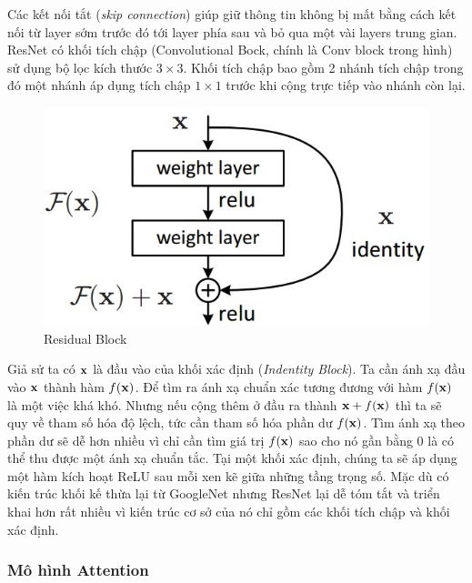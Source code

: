 \documentclass[14pt, a4paper]{article}
\numberwithin{equation}{section}
\numberwithin{algorithm}{section}
\numberwithin{figure}{section}
\numberwithin{table}{section}
\numberwithin{dl}{section}
\numberwithin{md}{section}
\numberwithin{bd}{section}
\numberwithin{dn}{section}
\numberwithin{hq}{section}
\begin{document}
    Các kết nối tắt (\textit{skip connection}) giúp giữ thông tin không bị mất bằng cách kết nối từ layer sớm trước đó tới layer phía sau và bỏ qua một vài layers trung gian.
    ResNet có khối tích chập (Convolutional Bock, chính là Conv block trong hình) sử dụng bộ lọc kích thước $3 \times 3$. 
    Khối tích chập bao gồm 2 nhánh tích chập trong đó một nhánh áp dụng tích chập $1 \times 1$ trước khi cộng trực tiếp vào nhánh còn lại.

    \begin{figure}[h!] \centering

        \includegraphics[scale=0.6]{Residual_Block.jpg}
        \caption{Residual Block}
        \label{fig:Residual_Block}

    \end{figure}

    Giả sử ta có $\bold{x}$ là đầu vào của khối xác định (\textit{Indentity Block}). Ta cần ánh xạ đầu vào $\bold{x}$ thành hàm $f(\bold{x})$. 
    Để tìm ra ánh xạ chuẩn xác tương đương với hàm $f(\bold{x})$ là một việc khá khó. 
    Nhưng nếu cộng thêm ở đầu ra thành $\bold{x} + f(\bold{x})$ thì ta sẽ quy về tham số hóa độ lệch, tức cần tham số hóa phần dư $f(\bold{x})$.
    Tìm ánh xạ theo phần dư sẽ dễ hơn nhiều vì chỉ cần tìm giá trị $f(\bold{x})$ sao cho nó gần bằng 0 là có thể thu được một ánh xạ chuẩn tắc.
    Tại một khối xác định, chúng ta sẽ áp dụng một hàm kích hoạt ReLU sau mỗi xen kẽ giữa những tầng trọng số. 
    Mặc dù có kiến trúc khối kế thừa lại từ GoogleNet nhưng ResNet lại dễ tóm tắt và triển khai hơn rất nhiều vì kiến trúc cơ sở của nó chỉ gồm các khối tích chập và khối xác định.
    
    \subsubsection{Mô hình Attention}
\end{document}
